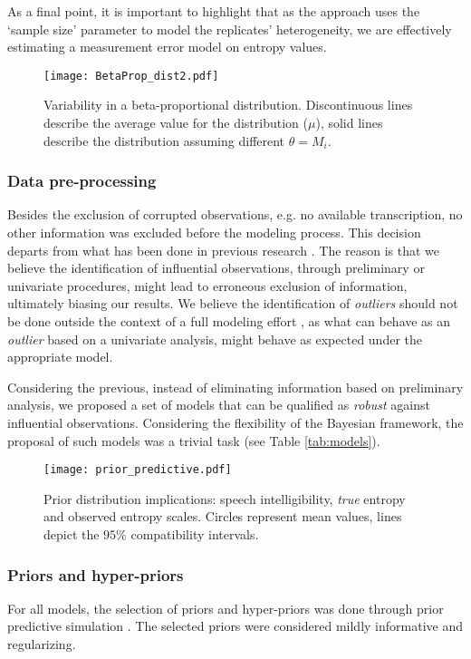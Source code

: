 As a final point, it is important to highlight that as the approach uses the `sample size' parameter to model the replicates' heterogeneity, we are effectively estimating a measurement error model \cite{Carroll_2006} on entropy values.
%
\begin{figure} [!h]
	\centering
	\texttt{[image: BetaProp\_dist2.pdf]}
	\caption[Variability in a beta-proportional distribution]{Variability in a beta-proportional distribution. Discontinuous lines describe the average value for the distribution ($\mu$), solid lines describe the distribution assuming different $\theta = M_{i}$.}
	\label{fig:BetaProp}
\end{figure}
%
%
\subsubsection{Data pre-processing} \label{ssSA:preprocessing}
%
Besides the exclusion of corrupted observations, e.g. no available transcription, no other information was excluded before the modeling process. This decision departs from what has been done in previous research \cite{Boonen_et_al_2020, vanDaal_2020, Boonen_et_al_2021}. The reason is that we believe the identification of influential observations, through preliminary or univariate procedures, might lead to erroneous exclusion of information, ultimately biasing our results. We believe the identification of \textit{outliers} should not be done outside the context of a full modeling effort \citep{McElreath_2020}, as what can behave as an \textit{outlier} based on a univariate analysis, might behave as expected under the appropriate model.

Considering the previous, instead of eliminating information based on preliminary analysis, we proposed a set of models that can be qualified as \textit{robust} against influential observations. Considering the flexibility of the Bayesian framework, the proposal of such models was a trivial task (see Table \ref{tab:models}).
%
%
%
\begin{figure}[!h]
	\centering
	\texttt{[image: prior\_predictive.pdf]}
	\caption[Prior distribution implications]{Prior distribution implications: speech intelligibility, \textit{true} entropy and observed entropy scales. Circles represent mean values, lines depict the $95\%$ compatibility intervals.}
	\label{fig:priors}
\end{figure}
%
%
\subsubsection{Priors and hyper-priors}
%
For all models, the selection of priors and hyper-priors was done through prior predictive simulation \citep{McElreath_2020}. The selected priors were considered mildly informative and regularizing. 

